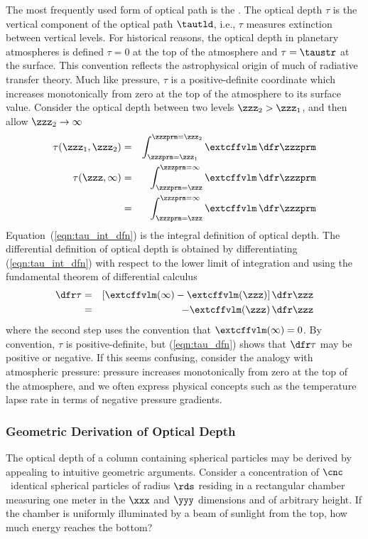 \documentclass[12pt]{article}
\begin{document}
The most frequently used form of optical path is the . 
The optical depth $\tau$ is the vertical component of the optical path
$\tautld$, i.e., $\tau$ measures extinction between vertical levels.
For historical reasons, the optical depth in planetary atmospheres is
defined $\tau = 0$ at the top of the atmosphere and $\tau = \taustr$
at the surface. 
This convention reflects the astrophysical origin of much of radiative
transfer theory.
Much like pressure, $\tau$ is a positive-definite coordinate which
increases monotonically from zero at the top of the atmosphere to its
surface value. 
Consider the optical depth between two levels $\zzz_{2} > \zzz_{1}$, and
then allow $\zzz_{2} \rightarrow \infty$
\begin{eqnarray}
\tau(\zzz_{1},\zzz_{2}) & = & \int_{\zzzprm=\zzz_{1}}^{\zzzprm=\zzz_{2}}
\extcffvlm \,\dfr\zzzprm \nonumber \\
\tau(\zzz,\infty) & = & 
\int_{\zzzprm=\zzz}^{\zzzprm=\infty} \extcffvlm \,\dfr\zzzprm \\
 & = & 
\int_{\zzzprm=\zzz}^{\zzzprm=\infty} \extcffvlm \,\dfr\zzzprm
\label{eqn:tau_int_dfn}
\end{eqnarray}
Equation~(\ref{eqn:tau_int_dfn}) is the integral definition of optical
depth. 
The differential definition of optical depth is obtained by
differentiating (\ref{eqn:tau_int_dfn}) with respect to the lower
limit of integration and using the fundamental theorem of
differential calculus  
\begin{eqnarray}
\dfr\tau & = & [\extcffvlm(\infty) - \extcffvlm(\zzz)] \,\dfr\zzz \nonumber
\\
& = & -\extcffvlm(\zzz) \,\dfr\zzz
\label{eqn:tau_dfn}
\end{eqnarray}
where the second step uses the convention that $\extcffvlm(\infty) =
0$.  
By convention, $\tau$ is positive-definite, but
(\ref{eqn:tau_dfn}) shows that $\dfr\tau$ may be positive or
negative. 
If this seems confusing, consider the analogy with atmospheric
pressure: pressure increases monotonically from zero at the top of the
atmosphere, and we often express physical concepts such as the
temperature lapse rate in terms of negative pressure gradients.

\subsubsection[Geometric Derivation of Optical Depth]{Geometric Derivation of Optical Depth}\label{sxn:tau_geo}
The optical depth of a column containing spherical particles may be
derived by appealing to intuitive geometric arguments. 
Consider a concentration of $\cnc$\,\xmC\ identical spherical particles 
of radius $\rds$ residing in a rectangular chamber measuring one meter
in the $\xxx$ and $\yyy$ dimensions and of arbitrary height.
If the chamber is uniformly illuminated by a  beam
of sunlight from the top, how much energy reaches the bottom?
\end{document}
